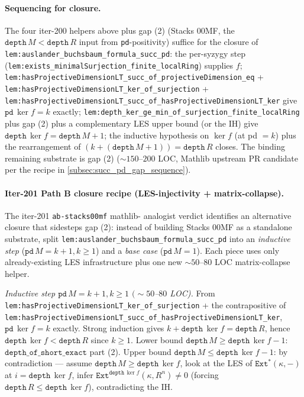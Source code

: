 \paragraph{Sequencing for closure.} The four iter-200 helpers above
plus gap (2) (Stacks 00MF, the \(\texttt{depth}\,M < \texttt{depth}\,R\)
input from \texttt{pd}-positivity) suffice for the closure of
\texttt{lem:auslander_buchsbaum_formula_succ_pd}: the per-syzygy step
(\texttt{lem:exists_minimalSurjection_finite_localRing}) supplies \(f\);
\texttt{lem:hasProjectiveDimensionLT_succ_of_projectiveDimension_eq}
+ \texttt{lem:hasProjectiveDimensionLT_ker_of_surjection} +
\texttt{lem:hasProjectiveDimensionLT_succ_of_hasProjectiveDimensionLT_ker}
give \(\texttt{pd}\,\ker f = k\) exactly;
\texttt{lem:depth_ker_ge_min_of_surjection_finite_localRing} plus gap (2)
plus a complementary LES upper bound (or the IH) give
\(\texttt{depth}\,\ker f = \texttt{depth}\,M + 1\); the inductive
hypothesis on \(\ker f\) (at pd \(=k\)) plus the rearrangement of
\((k + (\texttt{depth}\,M+1)) = \texttt{depth}\,R\) closes. The
binding remaining substrate is gap (2) (\(\sim 150\)--\(200\) LOC,
Mathlib upstream PR candidate per the recipe in
\ref{subsec:succ_pd_gap_sequence}).

\paragraph{Iter-201 Path B closure recipe (LES-injectivity +
matrix-collapse).} The iter-201 \texttt{ab-stacks00mf} mathlib-
analogist verdict identifies an alternative closure that sidesteps
gap (2): instead of building Stacks 00MF as a standalone substrate,
split \texttt{lem:auslander_buchsbaum_formula_succ_pd} into an
\emph{inductive step} (\(\texttt{pd}\,M = k+1, k \geq 1\)) and a
\emph{base case} (\(\texttt{pd}\,M = 1\)). Each piece uses only
already-existing LES infrastructure plus one new
\(\sim 50\)--\(80\) LOC matrix-collapse helper.

\textit{Inductive step \(\texttt{pd}\,M = k+1, k \geq 1\)
\((\sim 50\)--\(80\) LOC).} From
\texttt{lem:hasProjectiveDimensionLT_ker_of_surjection} +
the contrapositive of
\texttt{lem:hasProjectiveDimensionLT_succ_of_hasProjectiveDimensionLT_ker},
\(\texttt{pd}\,\ker f = k\) exactly. Strong induction gives
\(k + \texttt{depth}\,\ker f = \texttt{depth}\,R\), hence
\(\texttt{depth}\,\ker f < \texttt{depth}\,R\) since \(k \geq 1\).
Lower bound \(\texttt{depth}\,M \geq \texttt{depth}\,\ker f - 1\):
\(\texttt{depth\_of\_short\_exact}\) part (2). Upper bound
\(\texttt{depth}\,M \leq \texttt{depth}\,\ker f - 1\): by
contradiction --- assume \(\texttt{depth}\,M \geq \texttt{depth}\,\ker f\),
look at the LES of \(\texttt{Ext}^*(\kappa, -)\) at
\(i = \texttt{depth}\,\ker f\), infer
\(\texttt{Ext}^{\texttt{depth}\,\ker f}(\kappa, R^n) \neq 0\)
(forcing \(\texttt{depth}\,R \leq \texttt{depth}\,\ker f\)),
contradicting the IH.

